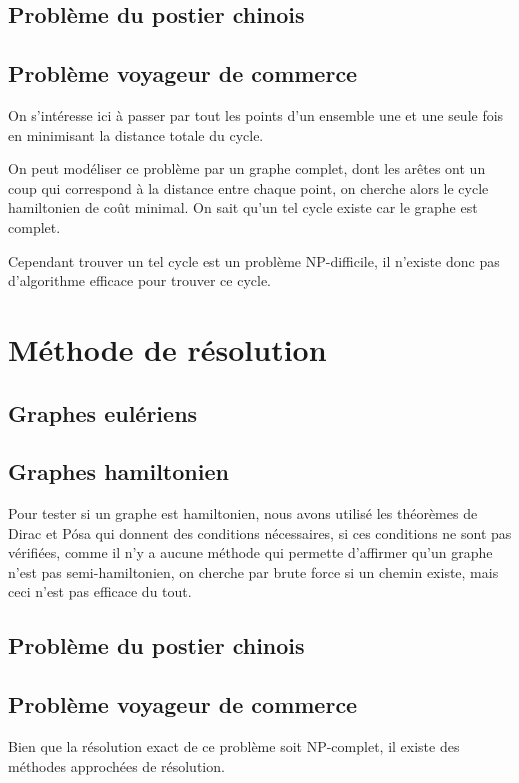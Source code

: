 \documentclass{scrartcl}
\begin{document}
  \subsection{Problème du postier chinois}
  \subsection{Problème voyageur de commerce}
    On s'intéresse ici à passer par tout les points d'un ensemble une et une
    seule fois en minimisant la distance totale du cycle.

    On peut modéliser ce problème par un graphe complet, dont les arêtes ont un
    coup qui correspond à la distance entre chaque point, on cherche alors le
    cycle hamiltonien de coût minimal. On sait qu'un tel cycle existe car le
    graphe est complet.

    Cependant trouver un tel cycle est un problème NP-difficile, il n'existe
    donc pas d'algorithme efficace pour trouver ce cycle.

\section{Méthode de résolution}
  \subsection{Graphes eulériens}
  \subsection{Graphes hamiltonien}
    Pour tester si un graphe est hamiltonien, nous avons utilisé les théorèmes
    de Dirac et Pósa qui donnent des conditions nécessaires, si ces conditions
    ne sont pas vérifiées, comme il n'y a aucune méthode qui permette
    d'affirmer qu'un graphe n'est pas semi-hamiltonien, on cherche par brute
    force si un chemin existe, mais ceci n'est pas efficace du tout.

  \subsection{Problème du postier chinois}
  \subsection{Problème voyageur de commerce}
    Bien que la résolution exact de ce problème soit NP-complet, il existe des
    méthodes approchées de résolution.
\end{document}
